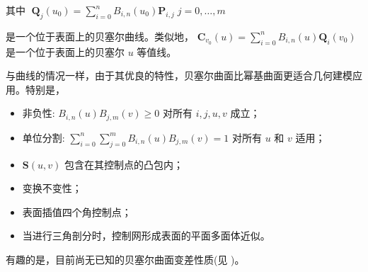 \documentclass[../main.tex]{subfiles}
\begin{document}
其中 \(\;{\mathbf{Q}}_{j}\left( {u}_{0}\right)  = \mathop{\sum }\limits_{{i = 0}}^{n}{B}_{i,n}\left( {u}_{0}\right) {\mathbf{P}}_{i,j}\;j = 0,\ldots ,m\)

是一个位于表面上的贝塞尔曲线。类似地， \({\mathbf{C}}_{{v}_{0}}\left( u\right)  = \mathop{\sum }\limits_{{i = 0}}^{n}{B}_{i,n}\left( u\right) {\mathbf{Q}}_{i}\left( {v}_{0}\right)\) 是一个位于表面上的贝塞尔 \(u\) 等值线。


与曲线的情况一样，由于其优良的特性，贝塞尔曲面比幂基曲面更适合几何建模应用。特别是，

\begin{itemize}
\item 非负性: \({B}_{i,n}\left( u\right) {B}_{j,m}\left( v\right)  \geq  0\) 对所有 \(i,j,u,v\) 成立；
\end{itemize}

\begin{itemize}
\item 单位分割: \(\mathop{\sum }\limits_{{i = 0}}^{n}\mathop{\sum }\limits_{{j = 0}}^{m}{B}_{i,n}\left( u\right) {B}_{j,m}\left( v\right)  = 1\) 对所有 \(u\) 和 \(v\) 适用；
\end{itemize}

\begin{itemize}
\item \(\mathbf{S}\left( {u,v}\right)\) 包含在其控制点的凸包内；
\end{itemize}

\begin{itemize}
\item 变换不变性；
\end{itemize}

\begin{itemize}
\item 表面插值四个角控制点；
\end{itemize}

\begin{itemize}
\item 当进行三角剖分时，控制网形成表面的平面多面体近似。
\end{itemize}

有趣的是，目前尚无已知的贝塞尔曲面变差性质(见 \cite{Prau92})。
\end{document}
